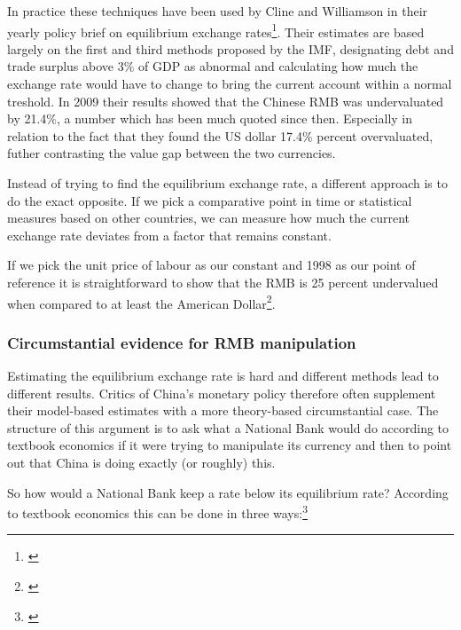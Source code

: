 In practice these techniques have been used by Cline and Williamson in 
their yearly policy brief on equilibrium exchange 
rates\footnote{\cite{cline2009,cline2012}}.  Their estimates are based 
largely on the first and third methods proposed by the IMF, designating 
debt and trade surplus above 3\% of GDP as abnormal and calculating how 
much the exchange rate would have to change to bring the current account 
within a normal treshold. In 2009 their results showed that the Chinese 
RMB was undervaluated by 21.4\%, a number which has been much quoted 
since then. Especially in relation to the fact that they found the US 
dollar 17.4\% percent overvaluated, futher contrasting the value gap 
between the two currencies.

% 
Instead of trying to find the equilibrium exchange rate, a different 
approach is to do the exact opposite. If we pick a comparative point in 
time or statistical measures based on other countries, we can measure 
how much the current exchange rate deviates from a factor that remains 
constant.

If we pick the unit price of labour as our constant and 1998 as our 
point of reference it is straightforward to show that the RMB is 25 
percent undervalued when compared to at least the American 
Dollar\footnote{\cite{chimerica2009}}. 


\subsubsection{Circumstantial evidence for RMB manipulation}

Estimating the equilibrium exchange rate is hard and different methods lead to different results. Critics of China's monetary policy therefore often supplement their model-based estimates with a more theory-based circumstantial case. The structure of this argument is to ask what a National Bank would do according to textbook economics if it were trying to manipulate its currency and then to point out that China is doing exactly (or roughly) this. 


So how would a National Bank keep a rate below its equilibrium rate? According to 
textbook economics this can be done in three ways:\footnote{\cite[pp. 
514]{Krugman2008}}

